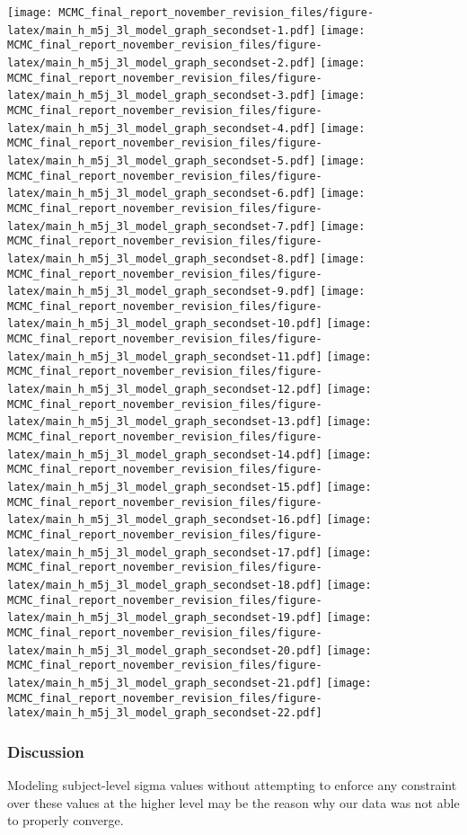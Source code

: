 \documentclass[]{article}
\begin{document}
\texttt{[image: MCMC\_final\_report\_november\_revision\_files/figure-latex/main\_h\_m5j\_3l\_model\_graph\_secondset-1.pdf]}
\texttt{[image: MCMC\_final\_report\_november\_revision\_files/figure-latex/main\_h\_m5j\_3l\_model\_graph\_secondset-2.pdf]}
\texttt{[image: MCMC\_final\_report\_november\_revision\_files/figure-latex/main\_h\_m5j\_3l\_model\_graph\_secondset-3.pdf]}
\texttt{[image: MCMC\_final\_report\_november\_revision\_files/figure-latex/main\_h\_m5j\_3l\_model\_graph\_secondset-4.pdf]}
\texttt{[image: MCMC\_final\_report\_november\_revision\_files/figure-latex/main\_h\_m5j\_3l\_model\_graph\_secondset-5.pdf]}
\texttt{[image: MCMC\_final\_report\_november\_revision\_files/figure-latex/main\_h\_m5j\_3l\_model\_graph\_secondset-6.pdf]}
\texttt{[image: MCMC\_final\_report\_november\_revision\_files/figure-latex/main\_h\_m5j\_3l\_model\_graph\_secondset-7.pdf]}
\texttt{[image: MCMC\_final\_report\_november\_revision\_files/figure-latex/main\_h\_m5j\_3l\_model\_graph\_secondset-8.pdf]}
\texttt{[image: MCMC\_final\_report\_november\_revision\_files/figure-latex/main\_h\_m5j\_3l\_model\_graph\_secondset-9.pdf]}
\texttt{[image: MCMC\_final\_report\_november\_revision\_files/figure-latex/main\_h\_m5j\_3l\_model\_graph\_secondset-10.pdf]}
\texttt{[image: MCMC\_final\_report\_november\_revision\_files/figure-latex/main\_h\_m5j\_3l\_model\_graph\_secondset-11.pdf]}
\texttt{[image: MCMC\_final\_report\_november\_revision\_files/figure-latex/main\_h\_m5j\_3l\_model\_graph\_secondset-12.pdf]}
\texttt{[image: MCMC\_final\_report\_november\_revision\_files/figure-latex/main\_h\_m5j\_3l\_model\_graph\_secondset-13.pdf]}
\texttt{[image: MCMC\_final\_report\_november\_revision\_files/figure-latex/main\_h\_m5j\_3l\_model\_graph\_secondset-14.pdf]}
\texttt{[image: MCMC\_final\_report\_november\_revision\_files/figure-latex/main\_h\_m5j\_3l\_model\_graph\_secondset-15.pdf]}
\texttt{[image: MCMC\_final\_report\_november\_revision\_files/figure-latex/main\_h\_m5j\_3l\_model\_graph\_secondset-16.pdf]}
\texttt{[image: MCMC\_final\_report\_november\_revision\_files/figure-latex/main\_h\_m5j\_3l\_model\_graph\_secondset-17.pdf]}
\texttt{[image: MCMC\_final\_report\_november\_revision\_files/figure-latex/main\_h\_m5j\_3l\_model\_graph\_secondset-18.pdf]}
\texttt{[image: MCMC\_final\_report\_november\_revision\_files/figure-latex/main\_h\_m5j\_3l\_model\_graph\_secondset-19.pdf]}
\texttt{[image: MCMC\_final\_report\_november\_revision\_files/figure-latex/main\_h\_m5j\_3l\_model\_graph\_secondset-20.pdf]}
\texttt{[image: MCMC\_final\_report\_november\_revision\_files/figure-latex/main\_h\_m5j\_3l\_model\_graph\_secondset-21.pdf]}
\texttt{[image: MCMC\_final\_report\_november\_revision\_files/figure-latex/main\_h\_m5j\_3l\_model\_graph\_secondset-22.pdf]}

\subsubsection{Discussion}\label{discussion-1}

Modeling subject-level sigma values without attempting to enforce any
constraint over these values at the higher level may be the reason why
our data was not able to properly converge.
\end{document}
